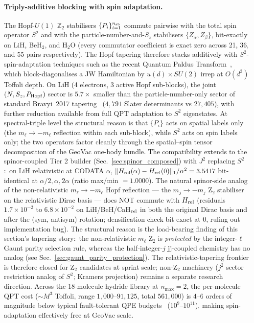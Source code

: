 \documentclass[aps,pra,twocolumn,superscriptaddress,longbibliography]{revtex4-2}
\begin{document}
\paragraph*{Triply-additive blocking with spin adaptation.}
The Hopf-$U(1)$ $\mathbb{Z}_2$ stabilisers $\{P_i\}_{i=1}^{n_{\rm sb}}$
commute pairwise with the total spin operator $S^2$ and with the
particle-number-and-$S_z$ stabilisers $\{Z_\alpha, Z_\beta\}$,
bit-exactly on LiH, BeH$_2$, and H$_2$O (every commutator coefficient
is exact zero across 21, 36, and 55 pairs respectively).  The Hopf tapering
therefore stacks additively with $S^2$-spin-adaptation techniques such
as the recent Quantum Paldus
Transform~\cite{burkat_fitzpatrick2025}, which block-diagonalises a JW
Hamiltonian by $u(d)\!\times\!SU(2)$ irrep at $O(d^3)$ Toffoli depth.
On LiH (4 electrons, 3 active Hopf sub-blocks), the joint $(N, S_z,
P_{\rm Hopf})$ sector is $5.7\times$ smaller than the
particle-number-only sector of standard Bravyi~2017
tapering~\cite{bravyi2017} ($4{,}791$ Slater determinants vs $27{,}405$),
with further reduction available from full QPT adaptation to $S^2$
eigenstates.  At spectral-triple level the structural reason is that
$\{P_i\}$ acts on spatial labels only (the $m_\ell \to -m_\ell$
reflection within each sub-block), while $S^2$ acts on spin labels
only; the two operators factor cleanly through the spatial--spin
tensor decomposition of the GeoVac one-body bundle.  The compatibility
extends to the spinor-coupled Tier 2 builder
(Sec.~\ref{sec:spinor_composed}) with $J^2$ replacing $S^2$:\ on LiH
relativistic at CODATA $\alpha$, $\|H_{\rm rel}(\alpha) - H_{\rm
rel}(0)\|_1 / \alpha^2 = 3.5417$ bit-identical at $\alpha/2, \alpha,
2\alpha$ (ratio max/min $= 1.0000$).  The natural spinor-side analog
of the non-relativistic $m_\ell \to -m_\ell$ Hopf reflection ---
the $m_j \to -m_j$ Z$_2$ stabiliser on the relativistic Dirac
basis --- does NOT commute with $H_{\rm rel}$ (residuals $1.7
\times 10^{-2}$ to $6.8 \times 10^{-2}$ on LiH/BeH/CaH$_{\rm rel}$
in both the original Dirac basis and after the (sym, antisym)
rotation; densification check bit-exact at $0$, ruling out
implementation bug). The structural reason is the load-bearing
finding of this section's tapering story:\ the non-relativistic
$m_\ell$ Z$_2$ is \emph{protected} by the integer-$\ell$ Gaunt
parity selection rule, whereas the half-integer-$j$ jj-coupled
chemistry has no analog (see Sec.~\ref{sec:gaunt_parity_protection}).
The relativistic-tapering frontier is therefore closed for Z$_2$
candidates at sprint scale; non-Z$_2$ machinery ($j^2$ sector
restriction analog of $S^2$; Kramers projection) remains a separate
research direction.  Across the $18$-molecule
hydride library at $n_{\max}=2$, the per-molecule QPT cost
($\sim M^3$ Toffoli, range $1{,}000$--$91{,}125$, total $561{,}000$)
is $4$--$6$ orders of magnitude below typical fault-tolerant QPE
budgets~\cite{lee2021,reiher2017} ($10^9$--$10^{11}$),
making spin-adaptation effectively free at GeoVac scale.
\end{document}
